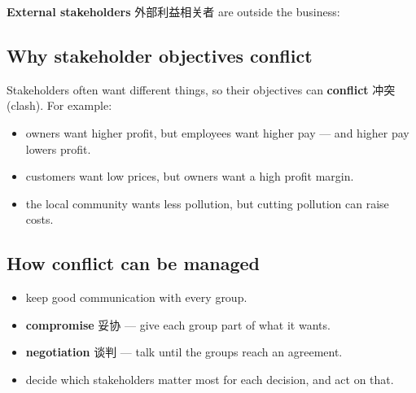 \documentclass[11pt]{article}
\begin{document}
\textbf{External stakeholders} 外部利益相关者 are outside the business:

\begin{center}
\end{center}

\subsection*{Why stakeholder objectives conflict}

Stakeholders often want different things, so their objectives can \textbf{conflict} 冲突 (clash). For example:

\begin{itemize}
\item owners want higher profit, but employees want higher pay — and higher pay lowers profit.

\item customers want low prices, but owners want a high profit margin.

\item the local community wants less pollution, but cutting pollution can raise costs.

\end{itemize}

\subsection*{How conflict can be managed}

\begin{itemize}
\item keep good communication with every group.

\item \textbf{compromise} 妥协 — give each group part of what it wants.

\item \textbf{negotiation} 谈判 — talk until the groups reach an agreement.

\item decide which stakeholders matter most for each decision, and act on that.

\end{itemize}
\end{document}
